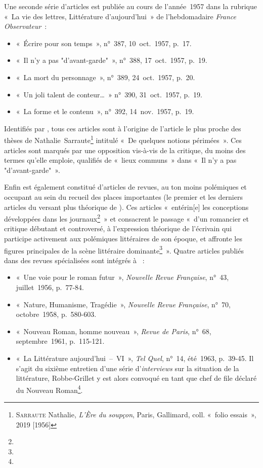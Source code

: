 \documentclass[12pt, a4paper]{article}
\begin{document}
Une seconde série d'articles est publiée au cours de l'année~1957 dans la rubrique «~La vie des lettres, Littérature d’aujourd’hui~» de l'hebdomadaire \textit{France Observateur}~:
\begin{itemize}
    \item «~Écrire pour son temps~», n°~387, 10~oct.~1957, p.~17.
    \item «~Il n’y a pas "d’avant-garde"~», n°~388, 17~oct.~1957, p.~19.
    \item «~La mort du personnage~», n°~389, 24~oct.~1957, p.~20.
    \item «~Un joli talent de conteur…~» n°~390, 31~oct.~1957, p.~19.
    \item «~La forme et le contenu~», n°~392, 14~nov.~1957, p.~19.
\end{itemize}
Identifiés par \galia, tous ces articles sont à l'origine de l'article le plus proche des thèses de Nathalie~Sarraute\footnote{\textsc{Sarraute} Nathalie, \textit{L'Ère du soupçon}, Paris, Gallimard, coll. «~folio essais~», 2019 [1956]} intitulé «~De quelques notions périmées~». Ces articles sont marqués par une opposition vis-à-vis de la critique, du moins des termes qu'elle emploie, qualifiés de «~lieux communs~» dans «~Il n’y a pas "d’avant-garde"~».

Enfin \punr{} est également constitué d'articles de revues, au ton moins polémiques et occupant au sein du recueil des places importantes (le premier et les derniers articles du versant plus théorique de \punr). Ces articles «~entérin[e] les conceptions développées dans les journaux\footnote{}~» et consacrent le passage «~d’un romancier et critique débutant et controversé, à l’expression théorique de l’écrivain qui participe activement aux polémiques littéraires de son époque, et affronte les figures principales de la scène littéraire dominante\footnote{}~». Quatre articles publiés dans des revues spécialisées sont intégrés à \punr~:
\begin{itemize}
    \item «~Une voie pour le roman futur~», \textit{Nouvelle Revue Française}, n°~43, juillet~1956, p.~77-84.
    \item «~Nature, Humanisme, Tragédie~», \textit{Nouvelle Revue Française}, n°~70, octobre~1958, p.~580-603.
    \item «~Nouveau Roman, homme nouveau~», \textit{Revue de Paris}, n°~68, septembre~1961, p.~115-121.
    \item «~La Littérature aujourd'hui~–~VI~», \textit{Tel Quel}, n°~14, été~1963, p.~39-45. Il s'agit du sixième entretien d'une série d'\textit{interviews} sur la situation de la littérature, Robbe-Grillet y est alors convoqué en tant que chef de file déclaré du Nouveau Roman\footnote{}.
\end{itemize}
\end{document}
